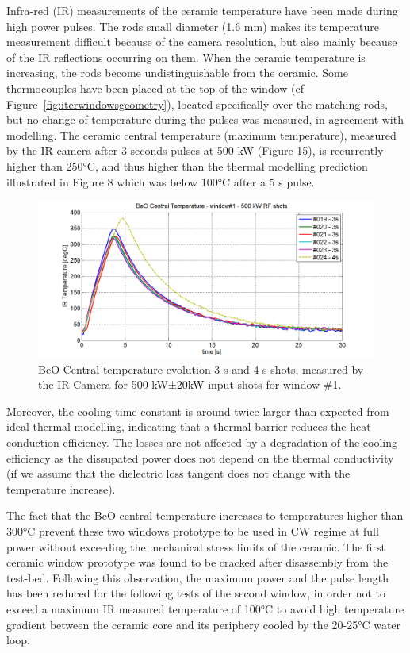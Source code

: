 {Infra-red (IR) measurements of the ceramic temperature have been made during high power pulses.  The rods small diameter (1.6 mm) makes its temperature measurement difficult because of the camera resolution, but also mainly because of the IR reflections occurring on them. When the ceramic temperature is increasing, the rods become undistinguishable from the ceramic. Some thermocouples have been placed at the top of the window (cf Figure~\ref{fig:iterwindowsgeometry}), located specifically over the matching rods, but no change of temperature during the pulses was measured, in agreement with modelling. The ceramic central temperature (maximum temperature), measured by the IR camera after 3 seconds pulses at 500 kW (Figure 15), is recurrently higher than 250$\si{\degreeCelsius}$, and thus higher than the thermal modelling prediction illustrated in Figure 8 which was below 100$\si{\degreeCelsius}$ after a 5 s pulse. 

\begin{figure}
	\centering
	\includegraphics[width=1.0\linewidth]{figures/chap3/ITER_window/ITER_windows_BeO_temperature}
	\caption{BeO Central temperature evolution 3 s and 4 s shots, measured by the IR Camera for 500 kW±20kW input shots for window \#1.}
	\label{fig:iterwindowsbeotemperature}
\end{figure}

Moreover, the cooling time constant is around twice larger than expected from ideal thermal modelling, indicating that a thermal barrier reduces the heat conduction efficiency. The losses are not affected by a degradation of the cooling efficiency as the dissupated power does not depend on the thermal conductivity (if we assume that the dielectric loss tangent does not change with the temperature increase). 

The fact that the BeO central temperature increases to temperatures higher than 300$\si{\degreeCelsius}$ prevent these two windows prototype to be used in CW regime at full power without exceeding the mechanical stress limits of the ceramic. The first ceramic window prototype was found to be cracked after disassembly from the test-bed. Following this observation, the maximum power and the pulse length has been reduced for the following tests of the second window, in order not to exceed a maximum IR measured temperature of 100$\si{\degreeCelsius}$ to avoid high temperature gradient between the ceramic core and its periphery cooled by the 20-25$\si{\degreeCelsius}$ water loop. 



}
